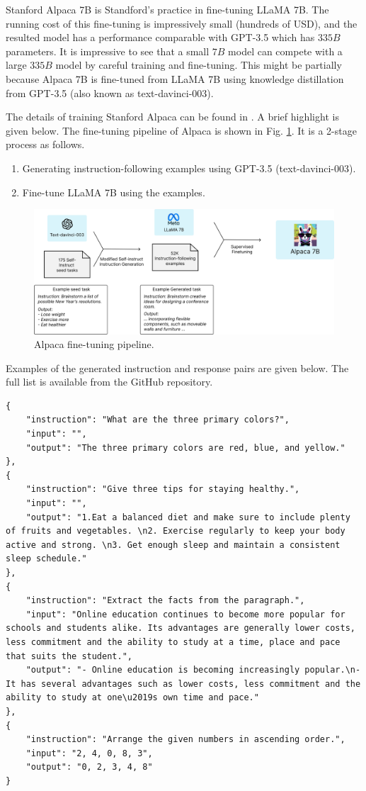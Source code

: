 Stanford Alpaca 7B is Standford's practice in fine-tuning LLaMA 7B. The running cost of this fine-tuning is impressively small (hundreds of USD), and the resulted model has a performance comparable with GPT-3.5 which has $335B$ parameters. It is impressive to see that a small $7B$ model can compete with a large $335B$ model by careful training and fine-tuning. This might be partially because Alpaca 7B is fine-tuned from LLaMA 7B using knowledge distillation from GPT-3.5 (also known as text-davinci-003).

The details of training Stanford Alpaca can be found in \cite{alpaca}. A brief highlight is given below. The fine-tuning pipeline of Alpaca is shown in Fig. \ref{fig:alpaca_pipeline}. It is a 2-stage process as follows.
\begin{enumerate}
	\item Generating instruction-following examples using GPT-3.5 (text-davinci-003).
	\item Fine-tune LLaMA 7B using the examples.
\end{enumerate}
\begin{figure}[!htb]
	\centering
	\includegraphics[width=\textwidth]{./chapters/part-4/figures/alpaca_pipeline.jpg}
	\caption{Alpaca fine-tuning pipeline.}
	\label{fig:alpaca_pipeline}
\end{figure}

Examples of the generated instruction and response pairs are given below. The full list is available from the GitHub repository.
\begin{lstlisting}
{
	"instruction": "What are the three primary colors?",
	"input": "",
	"output": "The three primary colors are red, blue, and yellow."
},
{
	"instruction": "Give three tips for staying healthy.",
	"input": "",
	"output": "1.Eat a balanced diet and make sure to include plenty of fruits and vegetables. \n2. Exercise regularly to keep your body active and strong. \n3. Get enough sleep and maintain a consistent sleep schedule."
},
{
	"instruction": "Extract the facts from the paragraph.",
	"input": "Online education continues to become more popular for schools and students alike. Its advantages are generally lower costs, less commitment and the ability to study at a time, place and pace that suits the student.",
	"output": "- Online education is becoming increasingly popular.\n- It has several advantages such as lower costs, less commitment and the ability to study at one\u2019s own time and pace."
},
{
	"instruction": "Arrange the given numbers in ascending order.",
	"input": "2, 4, 0, 8, 3",
	"output": "0, 2, 3, 4, 8"
}
\end{lstlisting}

